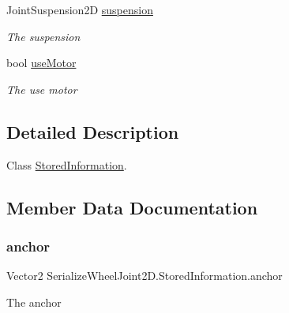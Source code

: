 \begin{DoxyCompactItemize}
Joint\+Suspension2D \hyperlink{class_serialize_wheel_joint2_d_1_1_stored_information_acdba859dd5c255edb6fd7a9ba9e94a7c}{suspension}
\begin{DoxyCompactList}\small\item\em The suspension \end{DoxyCompactList}\item 
bool \hyperlink{class_serialize_wheel_joint2_d_1_1_stored_information_acef713cbb1ef33d8d37c81534b671468}{use\+Motor}
\begin{DoxyCompactList}\small\item\em The use motor \end{DoxyCompactList}\end{DoxyCompactItemize}


\subsection{Detailed Description}
Class \hyperlink{class_serialize_wheel_joint2_d_1_1_stored_information}{Stored\+Information}. 



\subsection{Member Data Documentation}
\mbox{\label{class_serialize_wheel_joint2_d_1_1_stored_information_a3e064e6e94be24b60ad7737ad781d32a}} 
\subsubsection{\texorpdfstring{anchor}{anchor}}
{\footnotesize\ttfamily Vector2 Serialize\+Wheel\+Joint2\+D.\+Stored\+Information.\+anchor}



The anchor 

\mbox{\label{class_serialize_wheel_joint2_d_1_1_stored_information_a74047ba684f05a51888411a6504f62ff}} 
